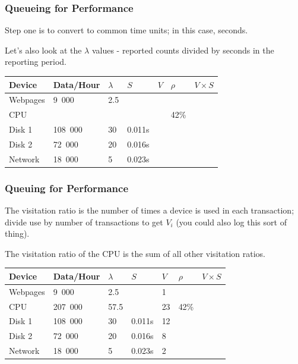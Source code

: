 \begin{frame}
\frametitle{Queueing for Performance}

Step one is to convert to common time units; in this case, seconds.

Let's also look at the $\lambda$ values - reported counts divided by seconds in the reporting period.

\begin{center}
\begin{tabular}{|l|l|l|l|l|l|l|} \hline
	\textbf{Device} & \textbf{Data/Hour} & \textbf{$\lambda$} & \textbf{$S$} & \textbf{$V$} & \textbf{$\rho$} & \textbf{$V \times S$} \\ \hline
	Webpages & 9~000 & 2.5 & & & & \\ \hline
	CPU & & & & & 42\% & \\ \hline
	Disk 1 & 108~000 & 30 & 0.011s  & & &\\ \hline
	Disk 2 & 72~000 & 20 & 0.016s & & &\\ \hline
	Network & 18~000 & 5 & 0.023s & & &\\ \hline
\end{tabular}
\end{center}

\end{frame}



\begin{frame}
\frametitle{Queuing for Performance}

The visitation ratio is the number of times a device is used in each transaction; divide use by number of transactions to get $V_{i}$ (you could also log this sort of thing). 

The visitation ratio of the CPU is the sum of all other visitation ratios.

\begin{center}
\begin{tabular}{|l|l|l|l|l|l|l|} \hline
	\textbf{Device} & \textbf{Data/Hour} & \textbf{$\lambda$} & \textbf{$S$} & \textbf{$V$} & \textbf{$\rho$} & \textbf{$V \times S$} \\ \hline
	Webpages & 9~000 & 2.5 & & 1 & & \\ \hline
	CPU & 207~000 & 57.5 &  & 23 & 42\% & \\ \hline
	Disk 1 & 108~000 & 30 & 0.011s  & 12& &\\ \hline
	Disk 2 & 72~000 & 20 & 0.016s & 8 & &\\ \hline
	Network & 18~000 & 5 & 0.023s & 2 & &\\ \hline
\end{tabular}
\end{center}

\end{frame}



